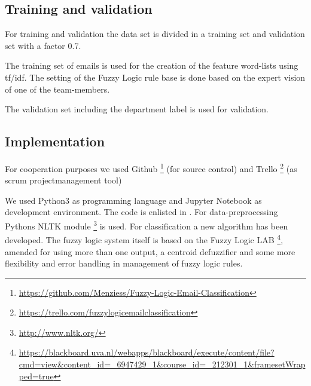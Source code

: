\documentclass[journal]{IEEEtran}
\begin{document}


\subsection{Training and validation}

For training and validation the data set is divided in a training set and validation set with a factor 0.7.

The training set of emails is used for the creation of the feature word-lists using tf/idf. The setting of the Fuzzy Logic rule base is done based on the expert vision of one of the team-members. 

The validation set including the department label is used for validation. 

\subsection{Implementation}

For cooperation purposes we used Github \footnote{\url{https://github.com/Menziess/Fuzzy-Logic-Email-Classification}} (for source control) and Trello \footnote{\url{https://trello.com/fuzzylogicemailclassification}} (as scrum projectmanagement tool)

We used Python3 as programming language and Jupyter Notebook as development
environment. The code is enlisted in . For data-preprocessing Pythons NLTK module \footnote{\url{http://www.nltk.org/}} is used. For classification a new algorithm has been developed. The fuzzy logic system itself is based on the Fuzzy Logic LAB \footnote{\url{https://blackboard.uva.nl/webapps/blackboard/execute/content/file?cmd=view&content_id=_6947429_1&course_id=_212301_1&framesetWrapped=true}}, amended for using more than one output, a centroid defuzzifier and some more flexibility and error handling in management of fuzzy logic rules.
\end{document}

